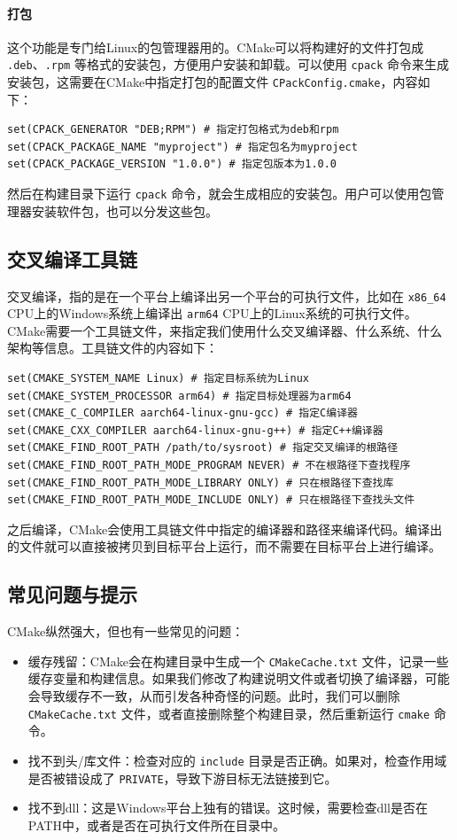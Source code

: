\paragraph{打包} 这个功能是专门给Linux的包管理器用的。CMake可以将构建好的文件打包成 \verb|.deb|、\verb|.rpm| 等格式的安装包，方便用户安装和卸载。可以使用 \verb|cpack| 命令来生成安装包，这需要在CMake中指定打包的配置文件 \verb|CPackConfig.cmake|，内容如下：
\begin{verbatim}
set(CPACK_GENERATOR "DEB;RPM") # 指定打包格式为deb和rpm
set(CPACK_PACKAGE_NAME "myproject") # 指定包名为myproject
set(CPACK_PACKAGE_VERSION "1.0.0") # 指定包版本为1.0.0
\end{verbatim}
然后在构建目录下运行 \verb|cpack| 命令，就会生成相应的安装包。用户可以使用包管理器安装软件包，也可以分发这些包。

\subsection{交叉编译工具链}

交叉编译，指的是在一个平台上编译出另一个平台的可执行文件，比如在 \verb|x86_64| CPU上的Windows系统上编译出 \verb|arm64| CPU上的Linux系统的可执行文件。CMake需要一个工具链文件，来指定我们使用什么交叉编译器、什么系统、什么架构等信息。工具链文件的内容如下：
\begin{verbatim}
set(CMAKE_SYSTEM_NAME Linux) # 指定目标系统为Linux
set(CMAKE_SYSTEM_PROCESSOR arm64) # 指定目标处理器为arm64
set(CMAKE_C_COMPILER aarch64-linux-gnu-gcc) # 指定C编译器
set(CMAKE_CXX_COMPILER aarch64-linux-gnu-g++) # 指定C++编译器
set(CMAKE_FIND_ROOT_PATH /path/to/sysroot) # 指定交叉编译的根路径
set(CMAKE_FIND_ROOT_PATH_MODE_PROGRAM NEVER) # 不在根路径下查找程序
set(CMAKE_FIND_ROOT_PATH_MODE_LIBRARY ONLY) # 只在根路径下查找库
set(CMAKE_FIND_ROOT_PATH_MODE_INCLUDE ONLY) # 只在根路径下查找头文件
\end{verbatim}
之后编译，CMake会使用工具链文件中指定的编译器和路径来编译代码。编译出的文件就可以直接被拷贝到目标平台上运行，而不需要在目标平台上进行编译。

\subsection{常见问题与提示} 

CMake纵然强大，但也有一些常见的问题：
\begin{itemize}
    \item 缓存残留：CMake会在构建目录中生成一个 \verb|CMakeCache.txt| 文件，记录一些缓存变量和构建信息。如果我们修改了构建说明文件或者切换了编译器，可能会导致缓存不一致，从而引发各种奇怪的问题。此时，我们可以删除 \verb|CMakeCache.txt| 文件，或者直接删除整个构建目录，然后重新运行 \verb|cmake| 命令。
    \item 找不到头/库文件：检查对应的 \verb|include| 目录是否正确。如果对，检查作用域是否被错设成了 \verb|PRIVATE|，导致下游目标无法链接到它。
    \item 找不到dll：这是Windows平台上独有的错误。这时候，需要检查dll是否在PATH中，或者是否在可执行文件所在目录中。
\end{itemize}

